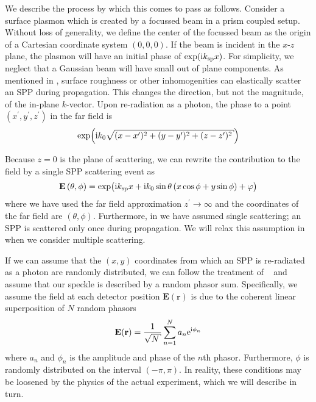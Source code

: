 We describe the process by which this comes to pass
as follows.  Consider a surface plasmon which is created by a focussed beam
in a prism coupled setup.  Without loss of generality, we define the center
of the focussed beam as the origin of a Cartesian coordinate system
$(0,0,0)$.  If the beam is incident in the $x$-$z$ plane, the plasmon will
have an initial phase of $\exp({\mathrm{i}} k_\mathrm{sp} x)$.  For simplicity, we neglect
that a Gaussian beam will have small out of plane components.  As mentioned
in , surface roughness or other inhomogenities can
elastically scatter an SPP during propagation.  This changes the direction,
but not the magnitude, of the in-plane $k$-vector.  Upon re-radiation as a
photon, the phase to a point
$(x^\prime,y^\prime,z^\prime)$ in the far field is 
\begin{equation}
\exp\!\left(\mi k_0 \sqrt{ (x-x^\prime)^2 + (y-y^\prime)^2 + (z-z^\prime)^2}\right)
\end{equation}

Because $z=0$ is the plane of scattering, we can rewrite the contribution
to the field by a single SPP scattering event as
\begin{equation}
\mathbf{E}\left(\theta,\phi\right)=\exp\!\big( {\mathrm{i}} k_\mathrm{sp} x  
+ {\mathrm{i}} k_0 \sin\theta \left(x\cos\phi+y\sin\phi\right)
+ \varphi\big)
\label{eqn:sppsinglescattering}
\end{equation}
where we have used the far field approximation $z^\prime\to\infty$ and the
coordinates of the far field are $(\theta,\phi)$.  Furthermore, in
 we have assumed single scattering; an
SPP is scattered only once during propagation.  We will relax this
assumption in  when we consider multiple
scattering.

If we can assume that the $(x,y)$ coordinates from which an SPP is
re-radiated as a photon are randomly distributed, we can follow the
treatment of ~\cite{goodman2007speckle} and assume that our
speckle is described by a random phasor sum.
Specifically, we assume the field at each detector position $\mathbf{E}(\mathbf{r})$
is due to the coherent linear superposition of $N$ random phasors
\begin{equation}
\mathbf{E}(\mathbf{r}) = \frac{1}{\sqrt{N}} \sum_{n=1}^{N} a_n \me^{\mi \phi_n}
\label{eqn:phasorsum}
\end{equation}
where $a_n$ and $\phi_n$ is the amplitude and phase of the $n$th phasor.
Furthermore, $\phi$ is randomly distributed on the interval $(-\pi,\pi)$.
In reality, these conditions may be loosened by the physics of the actual
experiment, which we will describe in turn.

